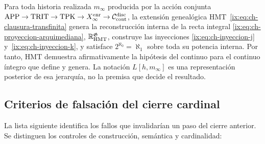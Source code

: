 \begin{theorem}
\label{ix:thm:decision-continuo-hmt}
Para toda historia realizada
\(m_\infty\) producida por la acción conjunta
\(\mathrm{APP}\to\mathrm{TRIT}\to\mathrm{TPK}\to
X_\infty^{\rm enr}\to\mathcal C_{\rm cont}^{\rm disc}\), la extensión
genealógica HMT~\eqref{ix:eq:ch-clausura-transfinita} genera la reconstrucción interna de la recta integral
\eqref{ix:eq:ch-proyeccion-arquimediana}, \(\mathbb R_{\rm HMT}^{\mathfrak G}\), construye las inyecciones
\eqref{ix:eq:ch-inyeccion-j} y~\eqref{ix:eq:ch-inyeccion-k}, y satisface
\(2^{\aleph_0}=\aleph_1\) sobre toda su potencia interna. Por tanto, HMT
demuestra afirmativamente la hipótesis del continuo para el continuo
íntegro que define y genera. La notación \(L[h,m_\infty]\) es una
representación posterior de esa jerarquía, no la premisa que decide el
resultado.
\end{theorem}


\subsection{Criterios de falsación del cierre cardinal}

La lista siguiente identifica los fallos que invalidarían un paso del cierre
anterior. Se distinguen los controles de construcción, semántica y
cardinalidad:

